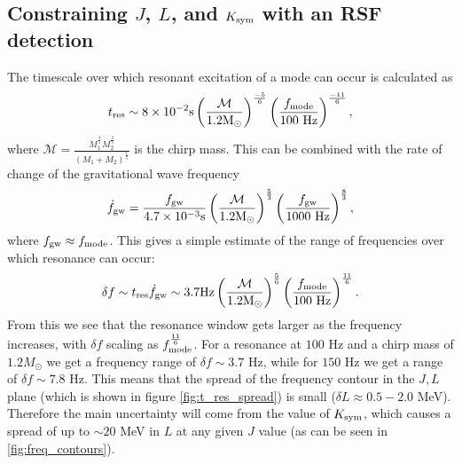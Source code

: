 \documentclass[fleqn,usenatbib]{mnras}
\begin{document}
\subsection{Constraining $J$, $L$, and $K_{\rm sym}$ with an RSF detection}
\hspace{\parindent}The timescale over which resonant excitation of a mode can occur is calculated as \citet{tsang2012resonant}
\begin{align}
t_{\rm res}\sim 8\times10^{-2}\text{s}\left(\frac{\mathcal{M}}{1.2\text{M}_{\odot}}\right)^{\frac{-5}{6}}\left(\frac{f_{\rm mode}}{100 \text{ Hz}}\right)^{\frac{-11}{6}},
\label{res_timescale}    
\end{align}
\noindent where $\mathcal{M}=\frac{M_1^{\frac{3}{5}}M_2^{\frac{3}{5}}}{(M_1+M_2)^{\frac{1}{5}}}$ is the chirp mass. This can be combined with the rate of change of the gravitational wave frequency
\begin{align}
\Dot{f}_{\rm gw}=\frac{f_{\rm gw}}{4.7\times10^{-3}\text{s}}\left(\frac{\mathcal{M}}{1.2\text{M}_{\odot}}\right)^{\frac{5}{3}}\left(\frac{f_{\rm gw}}{1000 \text{ Hz}}\right)^{\frac{8}{3}},
\label{res_timescale}    
\end{align}
\noindent where $f_{\rm gw}\approx f_{\rm mode}$. This gives a simple estimate of the range of frequencies over which resonance can occur:
\begin{align}
\delta f\sim t_{\rm res}\Dot{f}_{\rm gw}\sim3.7\text{Hz}\left(\frac{\mathcal{M}}{1.2\text{M}_{\odot}}\right)^{\frac{5}{6}}\left(\frac{f_{\rm mode}}{100 \text{ Hz}}\right)^{\frac{11}{6}}.
\label{res_timescale}    
\end{align}
\noindent From this we see that the resonance window gets larger as the frequency increases, with $\delta f$ scaling as $f_{\rm mode}^{\frac{11}{6}}$. For a resonance at $100$ Hz and a chirp mass of $1.2M_{\odot}$ we get a frequency range of $\delta f\sim 3.7$ Hz, while for $150$ Hz we get a range of $\delta f\sim 7.8$ Hz. This means that the spread of the frequency contour in the $J,L$ plane (which is shown in figure \ref{fig:t_res_spread}) is small ($\delta L\approx 0.5-2.0$ MeV). Therefore the main uncertainty will come from the value of $K_{\rm sym}$, which causes a spread of up to $\sim 20$ MeV in $L$ at any given $J$ value (as can be seen in \ref{fig:freq_contours}).
\end{document}
